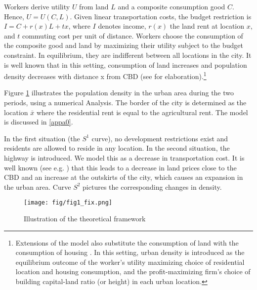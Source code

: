\documentclass[a4paper,authoryear,review]{elsarticle}  	%
\begin{document}
	Workers derive utility $U$ from land $L$ and a composite consumption good $C$. Hence, $U=U(C,L)$. Given linear transportation costs, the budget restriction is $I=C+r(x)L + tx$, where $I$ denotes income, $r(x)$ the land rent at location $x$, and $t$ commuting cost per unit of distance.
	Workers choose the consumption of the composite good and land by maximizing their utility subject to the budget constraint. In equilibrium, they are indifferent between all locations in the city. It is well known that in this setting, consumption of land increases and population density decreases with distance x from CBD (see \citet{Glaeser2008b,Brueckner1987} for elaboration).\footnote{Extensions of the model also substitute the consumption of land with the consumption of housing \citep{Muth1969,Brueckner1987,Glaeser2008b}. In this setting, urban density is introduced as the equilibrium outcome of the worker's utility maximizing choice of residential location and housing consumption, and the profit-maximizing firm's choice of building capital-land ratio (or height) in each urban location.}  
	
	Figure \ref{ch3.fig:1} illustrates the population density in the urban area during the two periods, using a numerical
	Analysis. The border of the city is determined as the location $\bar{x}$ where the residential rent is equal to the agricultural rent. The model is discussed in \ref{appa0}. 	
	
	In the first situation (the $S^{1}$ curve), no development restrictions exist and residents are allowed to reside in any location. In the second situation, the highway is introduced. We  model this as a decrease in transportation cost. It is well known (see e.g. \citet{Brueckner1987}) that this leads to a decrease in land prices close to the CBD and an increase at the outskirts of the city, which causes an expansion in the urban area.
	Curve $S^{2}$ pictures the corresponding changes in density. 
		
	\begin{figure}[!hbtp]
		\centering
		\caption{Illustration of the theoretical framework}
		\texttt{[image: fig/fig1\_fix.png]}\label{ch3.fig:1}
	\end{figure}
	
\end{document}
